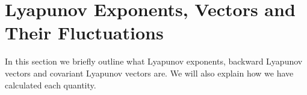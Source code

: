 \section{Lyapunov Exponents, Vectors and Their Fluctuations}

In this section we briefly outline what Lyapunov exponents, backward Lyapunov vectors and covariant Lyapunov vectors are. We will also explain how we have calculated each quantity.
